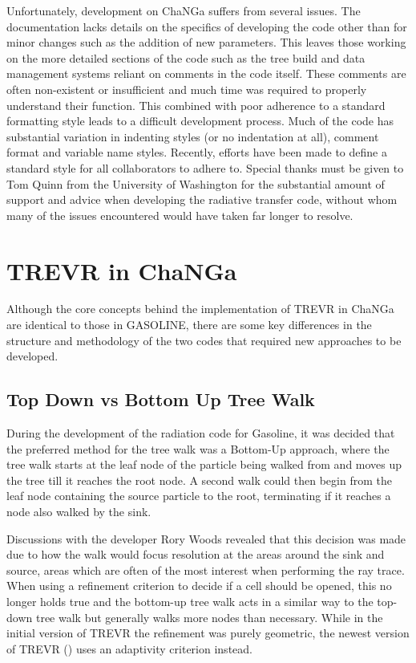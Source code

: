 Unfortunately, development on ChaNGa suffers from several issues. The documentation lacks details on the specifics of developing the code other than for minor changes such as the addition of new parameters. This leaves those working on the more detailed sections of the code such as the tree build and data management systems reliant on comments in the code itself. These comments are often non-existent or insufficient and much time was required to properly understand their function. This combined with poor adherence to a standard formatting style leads to a difficult development process. Much of the code has substantial variation in indenting styles (or no indentation at all), comment format and variable name styles. Recently, efforts have been made to define a standard style for all collaborators to adhere to. Special thanks must be given to Tom Quinn from the University of Washington for the substantial amount of support and advice when developing the radiative transfer code, without whom many of the issues encountered would have taken far longer to resolve.

\section{TREVR in ChaNGa}

Although the core concepts behind the implementation of TREVR in ChaNGa are identical to those in GASOLINE, there are some key differences in the structure and methodology of the two codes that required new approaches to be developed.

\subsection{Top Down vs Bottom Up Tree Walk}

During the development of the radiation code for Gasoline, it was decided that the preferred method for the tree walk was a Bottom-Up approach, where the tree walk starts at the leaf node of the particle being walked from and moves up the tree till it reaches the root node. A second walk could then begin from the leaf node containing the source particle to the root, terminating if it reaches a node also walked by the sink.

Discussions with the developer Rory Woods revealed that this decision was made due to how the walk would focus resolution at the areas around the sink and source, areas which are often of the most interest when performing the ray trace. When using a refinement criterion to decide if a cell should be opened, this no longer holds true and the bottom-up tree walk acts in a similar way to the top-down tree walk but generally walks more nodes than necessary. While in the initial version of TREVR the refinement was purely geometric, the newest version of TREVR (\citealt{grond}) uses an adaptivity criterion instead.

